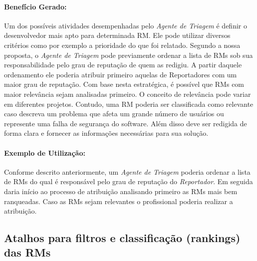 
\paragraph{Benefício Gerado:}
\label{par:papéis_afetados_s03}

Um dos possíveis atividades desempenhadas pelo \textit{Agente de Triagem} é
definir o desenvolvedor mais apto para determinada RM\@. Ele pode utilizar
diversos critérios como por exemplo a prioridade do que foi relatado. Segundo a
nossa proposta, o \textit{Agente de Triagem} pode previamente ordenar a lista de
RMs sob sua responsabilidade pelo grau de reputação de quem as redigiu. A partir
daquele ordenamento ele poderia atribuir primeiro aquelas de Reportadores com um
maior grau de reputação. Com base nesta estratégica, é possível que RMs com
maior relevância sejam analisadas primeiro. O conceito de relevância pode variar
em diferentes projetos. Contudo, uma RM poderia ser classificada como relevante
caso descreva um problema que afeta um grande número de usuários ou represente
uma falha de segurança do software.  Além disso deve ser redigida de forma clara
e fornecer as informações necessárias para sua solução.

\paragraph{Exemplo de Utilização:}
\label{par:exemplo_de_utilização_s03}

Conforme descrito anteriormente, um \textit{Agente de Triagem} poderia ordenar a
lista de RMs do qual é responsável pelo grau de reputação do
\textit{Reportador}. Em seguida daria início ao processo de atribuição
analisando primeiro as RMs mais bem ranqueadas. Caso as RMs sejam relevantes o
profissional poderia realizar a atribuição.

\subsection{Atalhos para filtros e classificação (rankings) das RMs}
\label{sub:histórico_das_ùltimas_rm_s}

